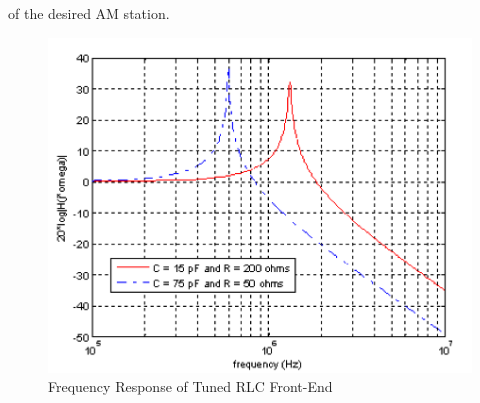 \documentclass[12pt]{article}
\begin{document}
of the desired AM station.
\begin{figure}[H]
\centering
\includegraphics[scale=0.5]{P3.jpg}
\caption{Frequency Response of Tuned RLC Front-End}
\end{figure}
\end{document}
